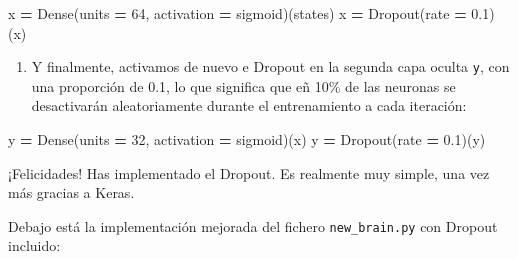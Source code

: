 \documentclass[
]{book}
\newenvironment{Shaded}{\begin{snugshade}}{\end{snugshade}}
\newcommand{\DecValTok}[1]{\textcolor[rgb]{0.00,0.00,0.81}{#1}}
\newcommand{\FloatTok}[1]{\textcolor[rgb]{0.00,0.00,0.81}{#1}}
\newcommand{\NormalTok}[1]{#1}
\newcommand{\OperatorTok}[1]{\textcolor[rgb]{0.81,0.36,0.00}{\textbf{#1}}}
\newcommand{\StringTok}[1]{\textcolor[rgb]{0.31,0.60,0.02}{#1}}
\providecommand{\tightlist}{%
  \setlength{\itemsep}{0pt}\setlength{\parskip}{0pt}}
\begin{document}
\begin{Shaded}
\begin{Highlighting}[]
\NormalTok{    x }\OperatorTok{=}\NormalTok{ Dense(units }\OperatorTok{=} \DecValTok{64}\NormalTok{, activation }\OperatorTok{=} \StringTok{\textquotesingle{}sigmoid\textquotesingle{}}\NormalTok{)(states)}
\NormalTok{    x }\OperatorTok{=}\NormalTok{ Dropout(rate }\OperatorTok{=} \FloatTok{0.1}\NormalTok{)(x)}
\end{Highlighting}
\end{Shaded}

\begin{enumerate}
\def\labelenumi{\arabic{enumi}.}
\setcounter{enumi}{2}
\tightlist
\item
  Y finalmente, activamos de nuevo e Dropout en la segunda capa oculta \texttt{y}, con una proporción de 0.1, lo que significa que eñ 10\% de las neuronas se desactivarán aleatoriamente durante el entrenamiento a cada iteración:
\end{enumerate}

\begin{Shaded}
\begin{Highlighting}[]
\NormalTok{    y }\OperatorTok{=}\NormalTok{ Dense(units }\OperatorTok{=} \DecValTok{32}\NormalTok{, activation }\OperatorTok{=} \StringTok{\textquotesingle{}sigmoid\textquotesingle{}}\NormalTok{)(x)}
\NormalTok{    y }\OperatorTok{=}\NormalTok{ Dropout(rate }\OperatorTok{=} \FloatTok{0.1}\NormalTok{)(y)}
\end{Highlighting}
\end{Shaded}

¡Felicidades! Has implementado el Dropout. Es realmente muy simple, una vez más gracias a Keras.

Debajo está la implementación mejorada del fichero \texttt{new\_brain.py} con Dropout incluido:
\end{document}
